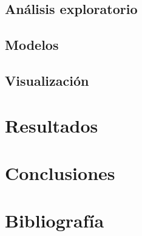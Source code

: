 \documentclass[
  10pt,
]{article}
\begin{document}
\hypertarget{anuxe1lisis-exploratorio}{%
\subsection{Análisis exploratorio}\label{anuxe1lisis-exploratorio}}

\hypertarget{modelos}{%
\subsection{Modelos}\label{modelos}}

\hypertarget{visualizaciuxf3n}{%
\subsection{Visualización}\label{visualizaciuxf3n}}

\hypertarget{resultados}{%
\section{Resultados}\label{resultados}}

\hypertarget{conclusiones}{%
\section{Conclusiones}\label{conclusiones}}

\hypertarget{bibliografuxeda}{%
\section{Bibliografía}\label{bibliografuxeda}}
\end{document}
